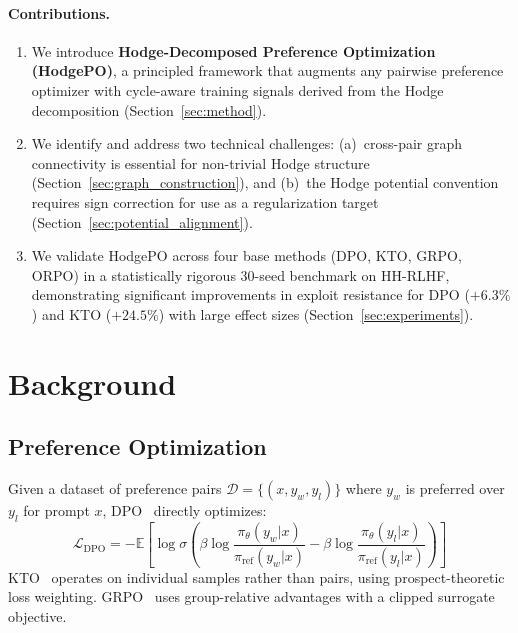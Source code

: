 \documentclass{article}
\begin{document}
\paragraph{Contributions.}
\begin{enumerate}
    \item We introduce \textbf{Hodge-Decomposed Preference Optimization (HodgePO)}, a principled framework that augments any pairwise preference optimizer with cycle-aware training signals derived from the Hodge decomposition (Section~\ref{sec:method}).
    \item We identify and address two technical challenges: (a)~cross-pair graph connectivity is essential for non-trivial Hodge structure (Section~\ref{sec:graph_construction}), and (b)~the Hodge potential convention requires sign correction for use as a regularization target (Section~\ref{sec:potential_alignment}).
    \item We validate HodgePO across four base methods (DPO, KTO, GRPO, ORPO) in a statistically rigorous 30-seed benchmark on HH-RLHF, demonstrating significant improvements in exploit resistance for DPO ($+6.3\%$) and KTO ($+24.5\%$) with large effect sizes (Section~\ref{sec:experiments}).
\end{enumerate}

\section{Background}
\label{sec:background}

\subsection{Preference Optimization}

Given a dataset of preference pairs $\mathcal{D} = \{(x, y_w, y_l)\}$ where $y_w$ is preferred over $y_l$ for prompt $x$, DPO~\citep{rafailov2023direct} directly optimizes:
\begin{equation}
    \mathcal{L}_\text{DPO} = -\mathbb{E}\left[\log \sigma\left(\beta \log \frac{\pi_\theta(y_w | x)}{\pi_\text{ref}(y_w | x)} - \beta \log \frac{\pi_\theta(y_l | x)}{\pi_\text{ref}(y_l | x)}\right)\right]
\label{eq:dpo}
\end{equation}
KTO~\citep{ethayarajh2024kto} operates on individual samples rather than pairs, using prospect-theoretic loss weighting. GRPO~\citep{shao2024deepseekmath} uses group-relative advantages with a clipped surrogate objective.
\end{document}
